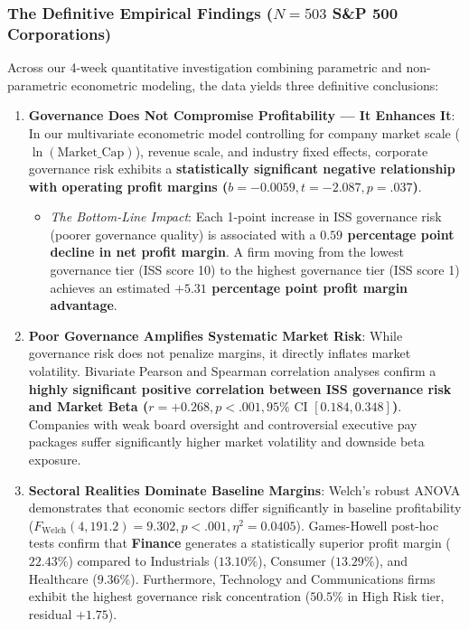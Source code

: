 \documentclass[
]{article}
\providecommand{\tightlist}{%
  \setlength{\itemsep}{0pt}\setlength{\parskip}{0pt}}
\begin{document}
\subsubsection{\texorpdfstring{The Definitive Empirical Findings
(\(N = 503\) S\&P 500
Corporations)}{The Definitive Empirical Findings (N = 503 S\&P 500 Corporations)}}\label{the-definitive-empirical-findings-n-503-sp-500-corporations}

Across our 4-week quantitative investigation combining parametric and
non-parametric econometric modeling, the data yields three definitive
conclusions:

\begin{enumerate}
\def\labelenumi{\arabic{enumi}.}
\tightlist
\item
  \textbf{Governance Does Not Compromise Profitability --- It Enhances
  It}: In our multivariate econometric model controlling for company
  market scale (\(\ln(\text{Market\_Cap})\)), revenue scale, and
  industry fixed effects, corporate governance risk exhibits a
  \textbf{statistically significant negative relationship with operating
  profit margins (\(b = -0.0059, t = -2.087, p = .037\))}.

  \begin{itemize}
  \tightlist
  \item
    \emph{The Bottom-Line Impact}: Each 1-point increase in ISS
    governance risk (poorer governance quality) is associated with a
    \textbf{\(0.59\) percentage point decline in net profit margin}. A
    firm moving from the lowest governance tier (ISS score 10) to the
    highest governance tier (ISS score 1) achieves an estimated
    \textbf{\(+5.31\) percentage point profit margin advantage}.
  \end{itemize}
\item
  \textbf{Poor Governance Amplifies Systematic Market Risk}: While
  governance risk does not penalize margins, it directly inflates market
  volatility. Bivariate Pearson and Spearman correlation analyses
  confirm a \textbf{highly significant positive correlation between ISS
  governance risk and Market Beta
  (\(r = +0.268, p < .001, 95\% \text{ CI } [0.184, 0.348]\))}.
  Companies with weak board oversight and controversial executive pay
  packages suffer significantly higher market volatility and downside
  beta exposure.
\item
  \textbf{Sectoral Realities Dominate Baseline Margins}: Welch's robust
  ANOVA demonstrates that economic sectors differ significantly in
  baseline profitability
  (\(F_{\text{Welch}}(4, 191.2) = 9.302, p < .001, \eta^2 = 0.0405\)).
  Games-Howell post-hoc tests confirm that \textbf{Finance} generates a
  statistically superior profit margin (\(22.43\%\)) compared to
  Industrials (\(13.10\%\)), Consumer (\(13.29\%\)), and Healthcare
  (\(9.36\%\)). Furthermore, Technology and Communications firms exhibit
  the highest governance risk concentration (\(50.5\%\) in High Risk
  tier, residual \(+1.75\)).
\end{enumerate}
\end{document}
